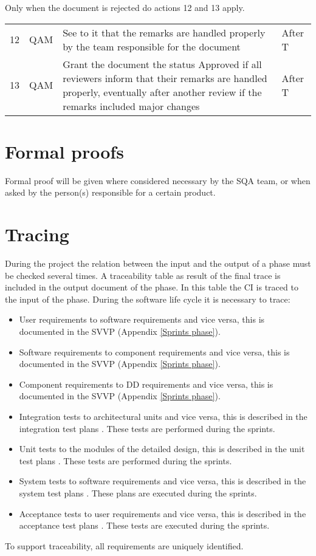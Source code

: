 \documentclass[%
		pathtobase=..,%
		titlefull={Software Validation and Verification Plan},%
		titleabbr=SVVP,%
		version=0.1]{fingerpaint}
\begin{document}
Only when the document is rejected do actions 12 and 13 apply.\\

\begin{tabular}{|l|p{6em}|p{20em}|p{6em}|}    
\hline          
12 & QAM  &      See to it that the remarks are handled properly by the team responsible for the document & After T\\
               
13 & QAM  &      Grant the document the status Approved if all reviewers inform that their remarks are handled properly, eventually       after another review if the remarks included major changes & After T\\
\hline
\end{tabular}


\section{Formal proofs}
Formal proof will be given where considered necessary by the SQA team, or when asked by the person(s) responsible for a certain product.

\section{Tracing} \label{tracing}
During the project the relation between the input and the output of a phase must be checked several times. A traceability table as result of the final trace is included in the output document of the phase. In this table the CI is traced to the input of the phase. During the software life cycle it is necessary to trace:

\begin{itemize}
\item User requirements to software requirements and vice versa, this is documented in the SVVP (Appendix \ref{Sprints phase}).
\item Software requirements to component requirements and vice versa, this is documented in the SVVP (Appendix \ref{Sprints phase}).
\item Component requirements to DD requirements and vice versa, this is documented in the SVVP (Appendix \ref{Sprints phase}).
\item Integration tests to architectural units and vice versa, this is described in the integration test plans \cite{itp}. These tests are performed during the sprints.
\item Unit tests to the modules of the detailed design, this is described in the unit test plans \cite{utp}. These tests are performed during the sprints.
\item System tests to software requirements and vice versa, this is described in the system test plans \cite{stp}. These plans \cite{spmp} are executed during the sprints.
\item Acceptance tests to user requirements and vice versa, this is described in the acceptance test plans \cite{atp}. These tests are executed during the sprints.
\end{itemize}
To support traceability, all requirements are uniquely identified.
\end{document}
